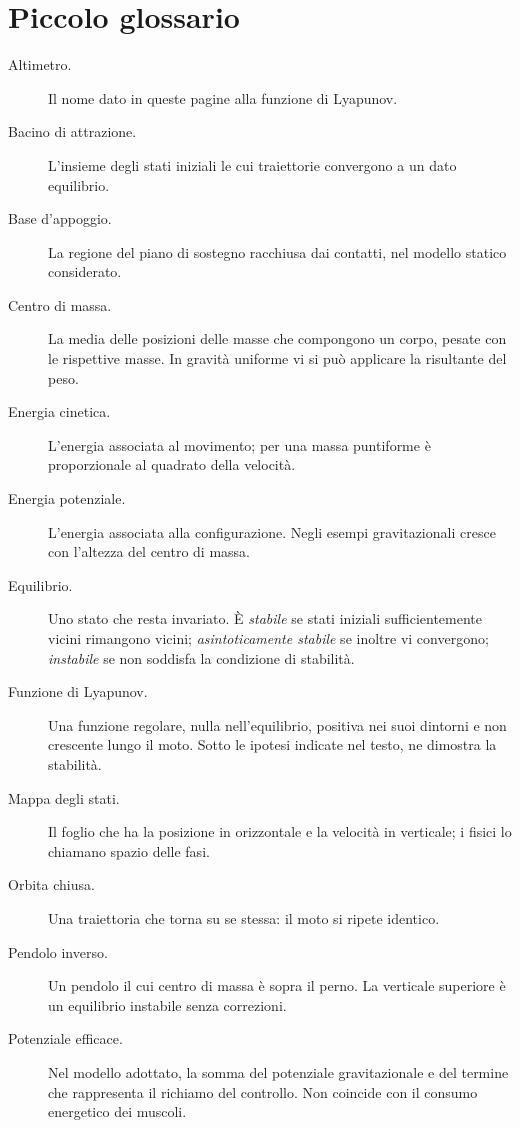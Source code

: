 \documentclass[11pt,a4paper,twoside=false,headinclude,footinclude]{scrartcl}
\begin{document}
\section*{Piccolo glossario}

{\small
\begin{description}
\item[Altimetro.] Il nome dato in queste pagine alla funzione di Lyapunov.
\item[Bacino di attrazione.] L'insieme degli stati iniziali le cui traiettorie convergono a un dato equilibrio.
\item[Base d'appoggio.] La regione del piano di sostegno racchiusa dai contatti, nel modello statico considerato.
\item[Centro di massa.] La media delle posizioni delle masse che compongono un corpo, pesate con le rispettive masse. In gravità uniforme vi si può applicare la risultante del peso.
\item[Energia cinetica.] L'energia associata al movimento; per una massa puntiforme è proporzionale al quadrato della velocità.
\item[Energia potenziale.] L'energia associata alla configurazione. Negli esempi gravitazionali cresce con l'altezza del centro di massa.
\item[Equilibrio.] Uno stato che resta invariato. È \emph{stabile} se stati iniziali sufficientemente vicini rimangono vicini; \emph{asintoticamente stabile} se inoltre vi convergono; \emph{instabile} se non soddisfa la condizione di stabilità.
\item[Funzione di Lyapunov.] Una funzione regolare, nulla nell'equilibrio, positiva nei suoi dintorni e non crescente lungo il moto. Sotto le ipotesi indicate nel testo, ne dimostra la stabilità.
\item[Mappa degli stati.] Il foglio che ha la posizione in orizzontale e la velocità in verticale; i fisici lo chiamano spazio delle fasi.
\item[Orbita chiusa.] Una traiettoria che torna su se stessa: il moto si ripete identico.
\item[Pendolo inverso.] Un pendolo il cui centro di massa è sopra il perno. La verticale superiore è un equilibrio instabile senza correzioni.
\item[Potenziale efficace.] Nel modello adottato, la somma del potenziale gravitazionale e del termine che rappresenta il richiamo del controllo. Non coincide con il consumo energetico dei muscoli.

\end{description}}
\end{document}
